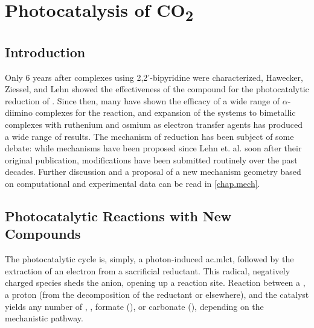 \chapter{Photocatalysis of \texorpdfstring{CO\textsubscript{2}}{CO2}}

\section{Introduction}

Only 6 years after  complexes using 2,2'-bipyridine were characterized, Hawecker, Ziessel, and Lehn showed the effectiveness of the compound for the photocatalytic reduction of \autocite{hawecker1983}. Since then, many have shown the efficacy of a wide range of $\alpha$-diimino complexes for the reaction, and expansion of the systems to bimetallic complexes with ruthenium and osmium as electron transfer agents has produced a wide range of results. The mechanism of reduction has been subject of some debate: while mechanisms have been proposed since Lehn et. al. soon after their original publication\autocite{hawecker1986}, modifications have been submitted routinely over the past decades. Further discussion and a proposal of a new mechanism geometry based on computational and experimental data can be read in \autoref{chap.mech}.

\section{Photocatalytic Reactions with New Compounds}

The photocatalytic cycle is, simply, a photon-induced \gls{ac.mlct}, followed by the extraction of an electron from a sacrificial reductant. This radical, negatively charged species sheds the anion, opening up a reaction site. Reaction between a , a proton (from the decomposition of the reductant or elsewhere), and the catalyst yields any number of , , formate (), or carbonate (), depending on the mechanistic pathway. 

